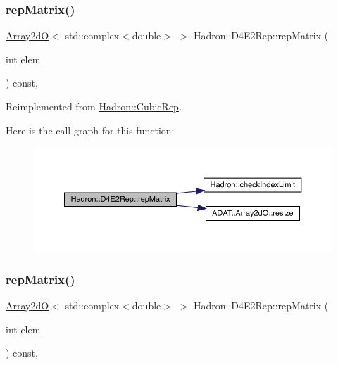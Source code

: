 \subsubsection{\texorpdfstring{repMatrix()}{repMatrix()}\hspace{0.1cm}{\footnotesize\ttfamily [1/2]}}
{\footnotesize\ttfamily \mbox{\hyperlink{classADAT_1_1Array2dO}{Array2dO}}$<$ std\+::complex$<$double$>$ $>$ Hadron\+::\+D4\+E2\+Rep\+::rep\+Matrix (\begin{DoxyParamCaption}\item[{int}]{elem }\end{DoxyParamCaption}) const\hspace{0.3cm}{\ttfamily [inline]}, {\ttfamily [virtual]}}



Reimplemented from \mbox{\hyperlink{structHadron_1_1CubicRep_ac5d7e9e6f4ab1158b5fce3e4ad9e8005}{Hadron\+::\+Cubic\+Rep}}.

Here is the call graph for this function\+:
\nopagebreak
\begin{figure}[H]
\begin{center}
\leavevmode
\includegraphics[width=350pt]{d5/da6/structHadron_1_1D4E2Rep_ae07926c0c41e03ed930683eb4e9be5f5_cgraph}
\end{center}
\end{figure}
\mbox{\label{structHadron_1_1D4E2Rep_ae07926c0c41e03ed930683eb4e9be5f5}} 
\subsubsection{\texorpdfstring{repMatrix()}{repMatrix()}\hspace{0.1cm}{\footnotesize\ttfamily [2/2]}}
{\footnotesize\ttfamily \mbox{\hyperlink{classADAT_1_1Array2dO}{Array2dO}}$<$ std\+::complex$<$double$>$ $>$ Hadron\+::\+D4\+E2\+Rep\+::rep\+Matrix (\begin{DoxyParamCaption}\item[{int}]{elem }\end{DoxyParamCaption}) const\hspace{0.3cm}{\ttfamily [inline]}, {\ttfamily [virtual]}}




